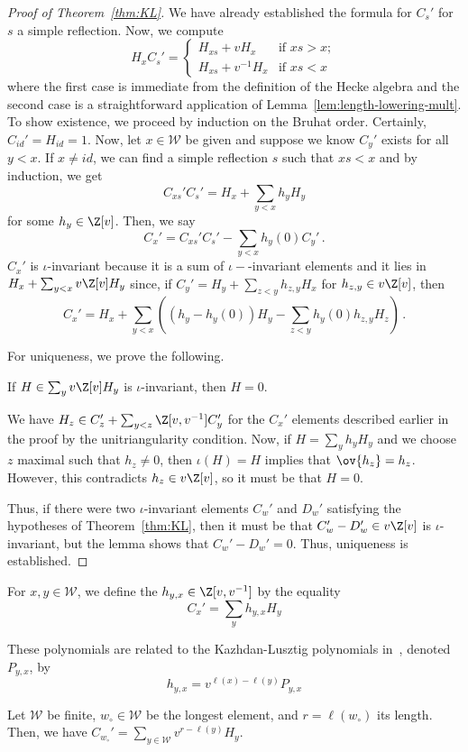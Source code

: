 \documentclass[11pt,leqno,oneside]{amsart}
\numberwithin{thm}{section}
\renewcommand{\W}{\mathcal{W}}
\begin{document}
\begin{proof}[Proof of Theorem~\ref{thm:KL}]
  We have already established the formula for \(C_s'\) for \(s\) a
  simple reflection. Now, we compute \[
    H_x C_s' =
    \begin{cases}
      H_{xs} + vH_x & \text{if } xs > x;\\
      H_{xs} + v^{-1} H_x & \text{if } xs < x
    \end{cases}
  \]
  where the first case is immediate from the definition of the Hecke
  algebra and the second case is a straightforward application
  of Lemma~\ref{lem:length-lowering-mult}. 
  To show existence, we proceed by induction on
  the Bruhat order. Certainly, \(C_{id}' = H_{id} = 1\). Now, let \(x
  \in \W\) be 
  given and suppose we know \(C_y'\) exists for all \(y < x\). If
  \(x \neq id\), we can find a simple reflection \(s\) such that \(xs
  < x\) and by induction, we get \[
    C_{xs}' C_s' = H_x + \sum_{y < x} h_y H_y
  \]
  for some \(h_y \in \Z[v]\). Then, we say \[
    C_x' = C_{xs}' C_s' - \sum_{y < x} h_y(0) C_y' \,.
  \]
  \(C_x'\) is \(\iota\)-invariant because it is a sum of
  \(\iota-\)-invariant elements and it lies in \(H_x + \sum_{y <
    x}v\Z[v] H_y \) since, if \(C_y' = H_y + \sum_{z < y} h_{z,y} H_x\) for
  \(h_{z,y} \in v\Z[v]\),
  then \[
    C_x' = H_x + \sum_{y < x} \left( (h_y - h_y(0)) H_y - \sum_{z<y}
      h_y(0) h_{z,y} H_z \right) \,. 
  \]

  For uniqueness, we prove the following.
  \begin{lem}
    If \(H \in \sum_y v \Z[v] H_y\) is \(\iota\)-invariant, then \(H =
    0\). 
  \end{lem}
  We have \(H_z \in C_z' + \sum_{y < z}\Z[v,v^{-1}] C_y'\) for the
  \(C_x'\) elements described earlier in the proof by the
  unitriangularity condition. Now, if \(H = \sum_y h_y H_y\) and we
  choose \(z\) maximal such that \(h_z \neq 0\), then \(\iota(H) = H\)
  implies that \(\ov{h_z} = h_z\). However, this contradicts \(h_z \in
  v\Z[v]\), so it must be that \(H = 0\).

  Thus, if there were two \(\iota\)-invariant elements \(C_w'\) and
  \(D_w'\) satisfying the hypotheses of Theorem~\ref{thm:KL}, then it must be
  that \(C_w'-D_w' \in v \Z[v]\) is \(\iota\)-invariant, but the lemma
  shows that \(C_w'-D_w' = 0\). Thus, uniqueness is established.
\end{proof}
\begin{defn}
  For \(x,y \in \W\), we define the 
  \(h_{y,x} \in \Z[v,v^{-1}]\) by the 
  equality \[
    C_x' = \sum_y h_{y,x} H_y
  \]
\end{defn}
\begin{rmk}
  These polynomials are related to the Kazhdan-Lusztig polynomials
  in~\cite{kl}, denoted \(P_{y,x}\), by \[
    h_{y,x} = v^{\ell(x)-\ell(y)} P_{y,x}
  \]
\end{rmk}
\begin{prop}
  Let \(\W\) be finite, \(w_\circ \in \W\) be the longest element, and
  \(r = \ell(w_\circ)\) its length. Then, we have \(C_{w_\circ}' = \sum_{y \in \W}
  v^{r-\ell(y)} H_y\).
\end{prop}
\end{document}
